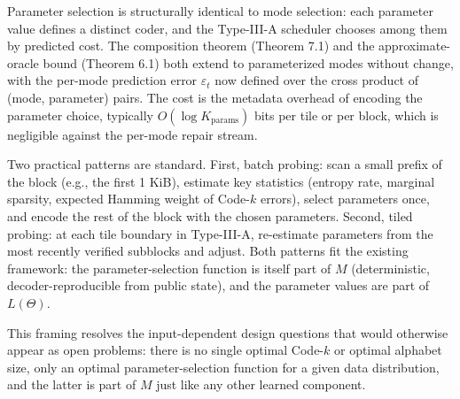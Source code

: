 \documentclass[
]{article}
\begin{document}
Parameter selection is structurally identical to mode selection: each
parameter value defines a distinct coder, and the Type-III-A scheduler
chooses among them by predicted cost. The composition theorem
(Theorem 7.1) and the approximate-oracle bound (Theorem 6.1) both
extend to parameterized modes without change, with the per-mode
prediction error $\varepsilon_t$ now defined over the cross product of
(mode, parameter) pairs. The cost is the metadata overhead of encoding
the parameter choice, typically $O(\log K_{\text{params}})$ bits per
tile or per block, which is negligible against the per-mode repair
stream.

Two practical patterns are standard. First, batch probing: scan a
small prefix of the block (e.g., the first 1 KiB), estimate key
statistics (entropy rate, marginal sparsity, expected Hamming weight
of Code-$k$ errors), select parameters once, and encode the rest of
the block with the chosen parameters. Second, tiled probing: at each
tile boundary in Type-III-A, re-estimate parameters from the most
recently verified subblocks and adjust. Both patterns fit the
existing framework: the parameter-selection function is itself part
of $M$ (deterministic, decoder-reproducible from public state), and
the parameter values are part of $L(\Theta)$.

This framing resolves the input-dependent design questions that would
otherwise appear as open problems: there is no single optimal
Code-$k$ or optimal alphabet size, only an optimal
parameter-selection function for a given data distribution, and the
latter is part of $M$ just like any other learned component.
\end{document}
